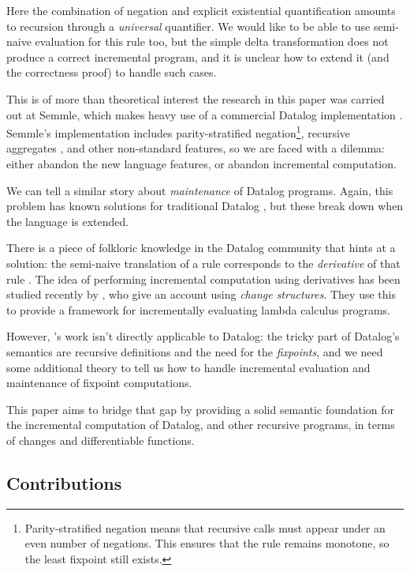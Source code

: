 Here the combination of negation and explicit existential quantification amounts
to recursion through a \emph{universal} quantifier. We would
like to be able to use semi-naive evaluation for this rule too, but the simple delta
transformation does not produce a correct incremental program, and it is unclear how to extend it (and the
correctness proof) to handle such cases.

This is of more than theoretical interest \textemdash{} the research
in this paper was carried out at Semmle, which
makes heavy use of a commercial Datalog implementation
\autocites{semmleWebsite}{avgustinov2016ql}{sereni2008adding}{schafer2010type}.
Semmle's implementation includes parity-stratified negation\footnote{Parity-stratified negation means that recursive calls must
  appear under an even number of negations. This ensures that the rule remains
  monotone, so the least fixpoint still exists.},
recursive aggregates \autocite{demoor2013aggregates}, and other non-standard
features, so we are faced with a dilemma: either abandon the new language
features, or abandon incremental computation.

We can tell a similar story about \emph{maintenance} of Datalog programs. Again,
this problem has known solutions for traditional Datalog
\autocite{gupta1993maintaining}, but these break down when the language is extended.

There is a piece of folkloric knowledge in the Datalog community that hints at a
solution: the semi-naive translation of a rule corresponds to the
\emph{derivative} of that rule \autocites{bancilhon1986naive}[section
3.2.2]{bancilhon1986amateur}. The idea of performing incremental computation using derivatives has been
studied recently by \textcite{cai2014changes}, who give an account using
\emph{change structures}. They use this to provide a framework for incrementally evaluating lambda calculus programs.

However, \citeauthor{cai2014changes}'s work isn't directly applicable to Datalog: the tricky part
of Datalog's semantics are recursive definitions and the need for the \emph{fixpoints}, and we need some additional theory to tell us how to
handle incremental evaluation and maintenance of fixpoint computations.

This paper aims to bridge that gap by providing a solid semantic foundation for the incremental
computation of Datalog, and other recursive programs, in terms of changes and
differentiable functions.

\subsection{Contributions}

